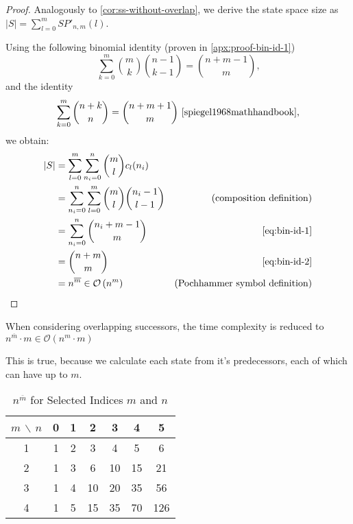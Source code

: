 \begin{proof}
    Analogously to \autoref{cor:ss-without-overlap}, we derive the state space size as $|S| = \sum_{l=0}^m SP'_{n,m}(l)$.

    Using the following binomial identity (proven in \ref{apx:proof-bin-id-1})
    \begin{equation} \label{eq:bin-id-1}
        \sum_{k=0}^m \binom{m}{k} \binom{n - 1}{k - 1} = \binom{n + m - 1}{m}\text{,}
    \end{equation}
    and the identity
    \begin{equation} \label{eq:bin-id-2}
        \sum_{k=0}^m \binom{n + k}{n} = \binom{n + m + 1}{m}~\cite{spiegel1968mathhandbook}\text{,}
    \end{equation}
    we obtain:
    \begin{align*}
    |S| 
    &= \sum_{l=0}^m \sum_{n_i=0}^{n} \binom{m}{l} c_l(n_i) \\
    &= \sum_{n_i=0}^{n} \sum_{l=0}^m \binom{m}{l} \binom{n_i - 1}{l - 1}  & \text{(composition definition)} \\
    &= \sum_{n_i=0}^{n} \binom{n_i + m - 1}{m} & \text{\eqref{eq:bin-id-1}} \\
    &= \binom{n + m}{m} & \text{\eqref{eq:bin-id-2}} \\
    &= n^{\overline{m}} \in \mathcal{O} \left( n^m \right) & \text{(Pochhammer symbol definition)}
    \end{align*}
\end{proof}

\begin{corollary}
    When considering overlapping successors, the time complexity is reduced to $n^{\overline{m}} \cdot m \in \mathcal{O} \left( n^m \cdot m \right)$
\end{corollary}

This is true, because we calculate each state from it's predecessors, each of which can have up to $m$.

\begin{table}
    \centering
    \begin{tabular}{c|cccccc}
    \hline
    \textbf{\(m\)} $\backslash$ \textbf{\(n\)} & \textbf{0} & \textbf{1} & \textbf{2} & \textbf{3} & \textbf{4} & \textbf{5} \\
    \hline
    1 & 1 & 2 & 3 & 4 & 5 & 6 \\
    2 & 1 & 3 & 6 & 10 & 15 & 21 \\
    3 & 1 & 4 & 10 & 20 & 35 & 56 \\
    4 & 1 & 5 & 15 & 35 & 70 & 126 \\
    \hline
    \end{tabular}
    \label{tab:sss-merged-successors}
    \caption{\( n^{\overline{m}} \) for Selected Indices \(m\) and \(n\)}
\end{table}

